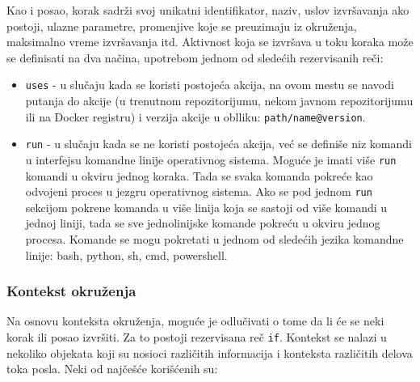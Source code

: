 \documentclass[12pt]{report}
\begin{document}
Kao i posao, korak sadrži svoj unikatni identifikator, naziv, uslov izvršavanja ako postoji, ulazne parametre, promenjive koje se preuzimaju iz okruženja, maksimalno vreme izvršavanja itd. Aktivnost koja se izvršava u toku koraka može se definisati na dva načina, upotrebom jednom od sledećih rezervisanih reči:

\begin{itemize}
    \item\texttt{uses} - u slučaju kada se koristi postojeća akcija, na ovom mestu se navodi putanja do akcije (u trenutnom repozitorijumu, nekom javnom repozitorijumu ili na Docker registru) i verzija akcije u oblliku: \texttt{path/name@version}.
    \item\texttt{run} - u slučaju kada se ne koristi postojeća akcija, već se definiše niz komandi u interfejsu komandne linije operativnog sistema. Moguće je imati više \texttt{run} komandi u okviru jednog koraka. Tada se svaka komanda pokreće kao odvojeni proces u jezgru operativnog sistema. Ako se pod jednom \texttt{run} sekcijom pokrene komanda u više linija koja se sastoji od više komandi u jednoj liniji, tada se sve jednolinijske komande pokreću u okviru jednog procesa. Komande se mogu pokretati u jednom od sledećih jezika komandne linije: bash, python, sh, cmd, powershell.
\end{itemize}

\subsubsection{Kontekst okruženja}
Na osnovu konteksta okruženja, moguće je odlučivati o tome da li će se neki korak ili posao izvršiti. Za to postoji rezervisana reč \texttt{if}. Kontekst se nalazi u nekoliko objekata koji su nosioci različitih informacija i konteksta različitih delova toka posla. Neki od najčešće korišćenih su:
\end{document}

